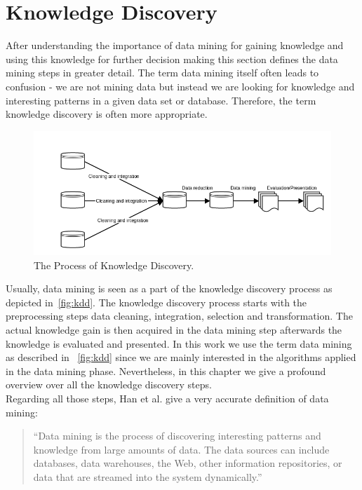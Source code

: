 \section{Knowledge Discovery}

After understanding the importance of data mining for gaining knowledge and using this knowledge for further decision making this section defines the data mining steps in greater detail. The term data mining itself often leads to confusion - we are not mining data but instead we are looking for knowledge and interesting patterns in a given data set or database. Therefore, the term knowledge discovery is often more appropriate.


\begin{figure}[htsb]
  \centering
  \includegraphics[scale=0.5]{figures/kdd}
  \caption[The Process of Knowledge Discovery]{The Process of Knowledge Discovery.}\label{fig:kdd}
\end{figure}

Usually, data mining is seen as a part of the knowledge discovery process as depicted in~\autoref{fig:kdd}. The knowledge discovery process starts with the preprocessing steps data cleaning, integration, selection and transformation. The actual knowledge gain is then acquired in the data mining step afterwards the knowledge is evaluated and presented. In this work we use the term data mining as described in ~\autoref{fig:kdd} since we are mainly interested in the algorithms applied in the data mining phase. Nevertheless, in this chapter we give a profound overview over all the knowledge discovery steps.
\\
Regarding all those steps, Han et al. give a very accurate definition of data mining: 
\begin{quote}
“Data mining is the process of discovering interesting patterns and knowledge from large amounts of data. The data sources can include databases, data warehouses, the Web, other information repositories, or data that are streamed into the system dynamically.”
\end{quote}
 

